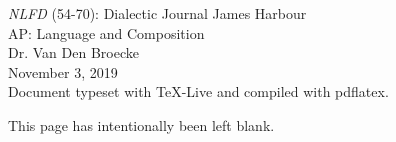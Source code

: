 \documentclass[12pt]{article}
\begin{document}
\begin{titlepage}
    \begin{center}
        \vspace*{1cm}
        \Large \emph{NLFD} (54-70): Dialectic Journal
        \vfill
        \large
        James Harbour\\
        \vspace{0.4cm}
        AP: Language and Composition\\
        \vspace{0.4cm}
        Dr. Van Den Broecke\\
        \vspace{0.4cm}
        November 3, 2019 \\
        \vspace{1.6cm}
        \normalsize
        Document typeset with TeX-Live and compiled with pdflatex.
        \vspace{0.5cm}
    \end{center}
\end{titlepage}

\pagestyle{empty}
\begin{center}
  \vspace{1cm}
  This page has intentionally been left blank.
  \vfill
\end{center}

\newpage

\pagestyle{fancy}
\fancyhf{}
\fancyhead[R]{(\thepage)}
\end{document}
